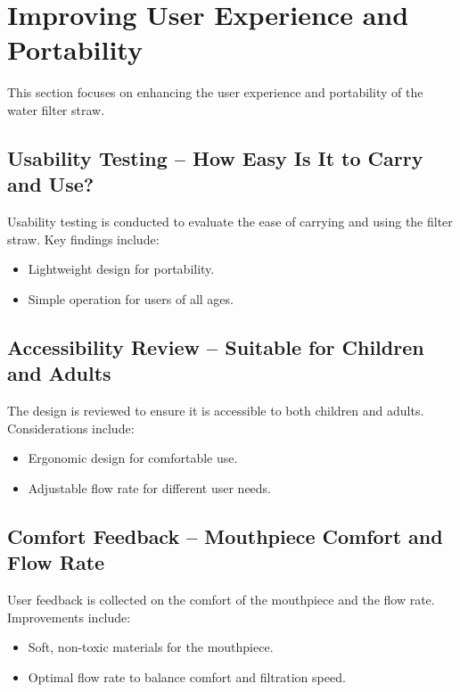 \documentclass{article}
\begin{document}
\newpage







\section{Improving User Experience and Portability}
This section focuses on enhancing the user experience and portability of the water filter straw.

\vspace{0.5cm}

\subsection{Usability Testing – How Easy Is It to Carry and Use?}
Usability testing is conducted to evaluate the ease of carrying and using the filter straw. Key findings include:
\begin{itemize}
    \item Lightweight design for portability.
    \item Simple operation for users of all ages.
\end{itemize}

\vspace{0.5cm}

\subsection{Accessibility Review – Suitable for Children and Adults}
The design is reviewed to ensure it is accessible to both children and adults. Considerations include:
\begin{itemize}
    \item Ergonomic design for comfortable use.
    \item Adjustable flow rate for different user needs.
\end{itemize}

\vspace{0.5cm}

\subsection{Comfort Feedback – Mouthpiece Comfort and Flow Rate}
User feedback is collected on the comfort of the mouthpiece and the flow rate. Improvements include:
\begin{itemize}
    \item Soft, non-toxic materials for the mouthpiece.
    \item Optimal flow rate to balance comfort and filtration speed.
\end{itemize}
\end{document}
